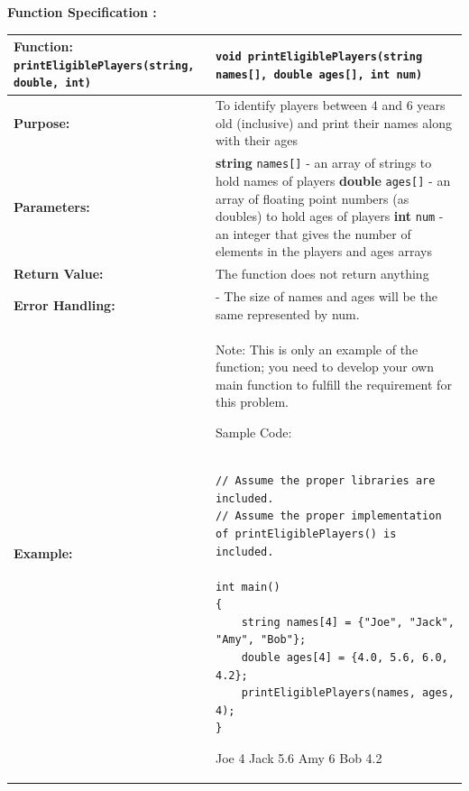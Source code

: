 \textbf{Function Specification :}

\renewcommand{\arraystretch}{1.5} 
\begin{longtable}{|p{1.7in}|p{4.3in}|}
\hline
\textbf{Function:}  \texttt{printEligiblePlayers(string, double, int)}& \texttt{void printEligiblePlayers(string names[], double ages[], int num)}\\ \hline

\textbf{Purpose:} & To identify players between 4 and 6 years old (inclusive) and print their names along with their ages\\ \hline

\textbf{Parameters:} & 
\textbf{string} \texttt{names[]} - an array of strings to hold names of players \newline
\textbf{double} \texttt{ages[]} - an array of floating point numbers (as doubles) to hold ages of players \newline
\textbf{int} \texttt{num} - an integer that gives the number of elements in the players and ages arrays
\\ \hline

\textbf{Return Value:} & 
The function does not return anything\\ \hline

\textbf{Error Handling:} & 
- The size of names and ages will be the same represented by num.\\ \hline

\textbf{Example:}& 

Note: This is only an example of the function; you need to develop your own main function to fulfill the requirement for this problem.

Sample Code:

\begin{example}
        \begin{verbatim}

// Assume the proper libraries are included.
// Assume the proper implementation of printEligiblePlayers() is included.

int main()
{
    string names[4] = {"Joe", "Jack", "Amy", "Bob"};
    double ages[4] = {4.0, 5.6, 6.0, 4.2};
    printEligiblePlayers(names, ages, 4);
}
        \end{verbatim}
        \end{example}

        \begin{sample}
Joe 4 \newline
Jack 5.6 \newline
Amy 6 \newline
Bob 4.2

        \end{sample}\\\hline
\end{longtable}
 
